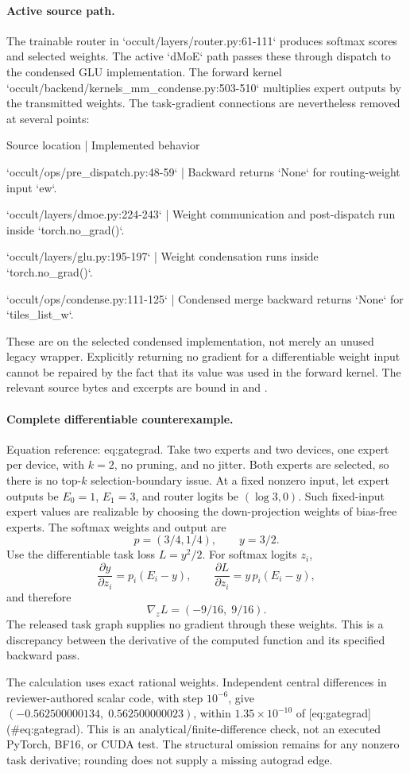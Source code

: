 \documentclass[10pt]{article}
\begin{document}
\paragraph*{Active source path.}\mbox{}\par
The trainable router in `occult/layers/router.py:61-111` produces softmax scores and selected weights. The active `dMoE` path passes these through dispatch to the condensed GLU implementation. The forward kernel `occult/backend/kernels\_mm\_condense.py:503-510` multiplies expert outputs by the transmitted weights. The task-gradient connections are nevertheless removed at several points:\par
Source location | Implemented behavior\par
`occult/ops/pre\_dispatch.py:48-59` | Backward returns `None` for routing-weight input `ew`.\par
`occult/layers/dmoe.py:224-243` | Weight communication and post-dispatch run inside `torch.no\_grad()`.\par
`occult/layers/glu.py:195-197` | Weight condensation runs inside `torch.no\_grad()`.\par
`occult/ops/condense.py:111-125` | Condensed merge backward returns `None` for `tiles\_list\_w`.\par
These are on the selected condensed implementation, not merely an unused legacy wrapper. Explicitly returning no gradient for a differentiable weight input cannot be repaired by the fact that its value was used in the forward kernel. The relevant source bytes and excerpts are bound in and .\par
\paragraph*{Complete differentiable counterexample.}\mbox{}\par
Equation reference: eq:gategrad. Take two experts and two devices, one expert per device, with \(k=2\), no pruning, and no jitter. Both experts are selected, so there is no top-\(k\) selection-boundary issue. At a fixed nonzero input, let expert outputs be \(E_0=1\), \(E_1=3\), and router logits be \((\log 3,0)\). Such fixed-input expert values are realizable by choosing the down-projection weights of bias-free experts. The softmax weights and output are \[p=(3/4,1/4),\qquad y=3/2.\] Use the differentiable task loss \(L=y^2/2\). For softmax logits \(z_i\), \[\frac{\partial y}{\partial z_i}=p_i(E_i-y),\qquad
 \frac{\partial L}{\partial z_i}=y\,p_i(E_i-y),\] and therefore \[\nabla_z L=(-9/16,\;9/16).
 \] The released task graph supplies no gradient through these weights. This is a discrepancy between the derivative of the computed function and its specified backward pass.\par
The calculation uses exact rational weights. Independent central differences in reviewer-authored scalar code, with step \(10^{-6}\), give \((-0.562500000134,\;0.562500000023)\), within \(1.35\times10^{-10}\) of [eq:gategrad] (\#eq:gategrad). This is an analytical/finite-difference check, not an executed PyTorch, BF16, or CUDA test. The structural omission remains for any nonzero task derivative; rounding does not supply a missing autograd edge.\par
\end{document}
